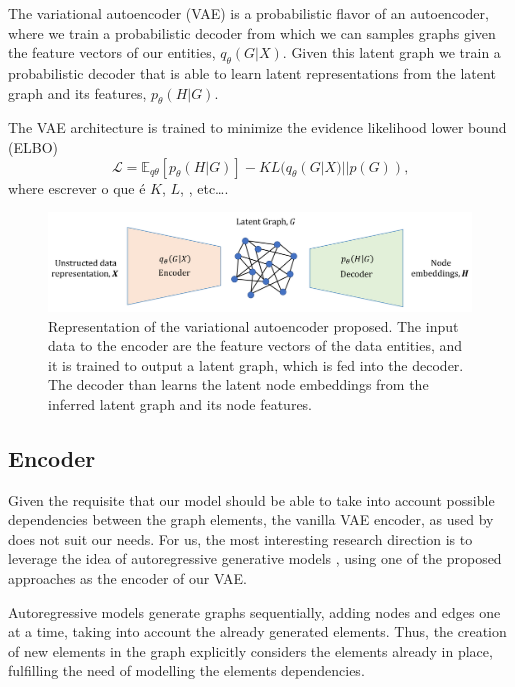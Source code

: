 \documentclass[12pt,a4paper]{article}
\begin{document}
	The variational autoencoder (VAE) is a probabilistic flavor of an autoencoder, where we train a probabilistic decoder from which we can samples graphs given the feature vectors of our entities, $q_\theta (G|X)$. Given this latent graph we train a probabilistic decoder that is able to learn latent representations from the latent graph and its features, $p_\theta (H|G)$.

	The VAE architecture is trained to minimize the evidence likelihood lower bound (ELBO)
	\begin{equation}
		\mathscr{L} = \mathbb{E}_{q\theta} [ p_\theta(H|G)] - KL(q_\theta (G|X)||p(G)) \text{,}\label{ELBO}
	\end{equation}
	where {\color{red} escrever o que é $K$, $L$, , etc\dots}.

	\begin{figure}[hbtp]
		\includegraphics[width=\textwidth]{vae_figure.png}
		\caption{Representation of the variational autoencoder proposed. The input data to the encoder are the feature vectors of the data entities, and it is trained to output a latent graph, which is fed into the decoder. The decoder than learns the latent node embeddings from the inferred latent graph and its node features.\label{vae}}
	\end{figure}


	\subsection{Encoder}

	Given the requisite that our model should be able to take into account possible dependencies between the graph elements, the vanilla VAE encoder, as used by \textcite{KipfNRI2018} does not suit our needs. For us, the most interesting research direction is to leverage the idea of autoregressive generative models \citep{Li2018, You2018, Liao2019}, using one of the proposed approaches as the encoder of our VAE.

	Autoregressive models generate graphs sequentially, adding nodes and edges one at a time, taking into account the already generated elements. Thus, the creation of new elements in the graph explicitly considers the elements already in place, fulfilling the need of modelling the elements dependencies.
\end{document}
